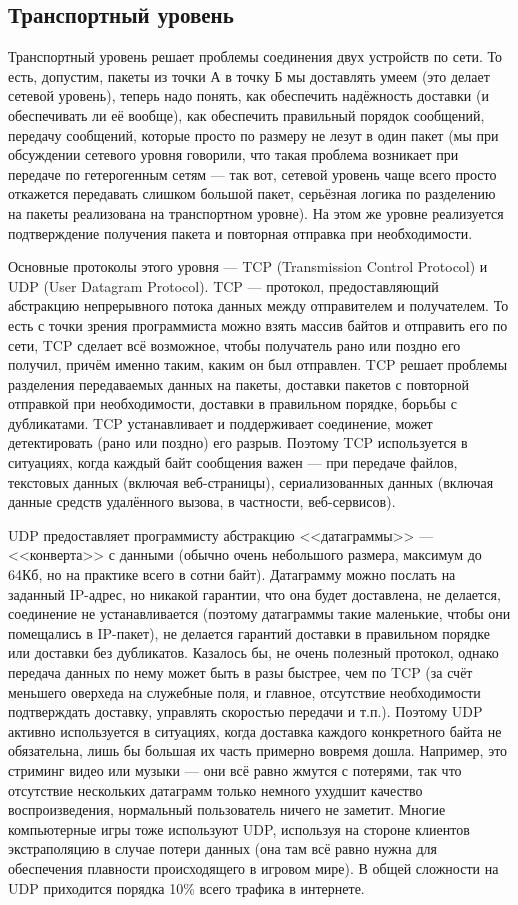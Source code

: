 \documentclass[a5paper]{article}
\begin{document}
\subsection{Транспортный уровень}

Транспортный уровень решает проблемы соединения двух устройств по сети. То есть, допустим, пакеты из точки А в точку Б мы доставлять умеем (это делает сетевой уровень), теперь надо понять, как обеспечить надёжность доставки (и обеспечивать ли её вообще), как обеспечить правильный порядок сообщений, передачу сообщений, которые просто по размеру не лезут в один пакет (мы при обсуждении сетевого уровня говорили, что такая проблема возникает при передаче по гетерогенным сетям --- так вот, сетевой уровень чаще всего просто откажется передавать слишком большой пакет, серьёзная логика по разделению на пакеты реализована на транспортном уровне). На этом же уровне реализуется подтверждение получения пакета и повторная отправка при необходимости.

Основные протоколы этого уровня --- TCP (Transmission Control Protocol) и UDP (User Datagram Protocol). TCP --- протокол, предоставляющий абстракцию непрерывного потока данных между отправителем и получателем. То есть с точки зрения программиста можно взять массив байтов и отправить его по сети, TCP сделает всё возможное, чтобы получатель рано или поздно его получил, причём именно таким, каким он был отправлен. TCP решает проблемы разделения передаваемых данных на пакеты, доставки пакетов с повторной отправкой при необходимости, доставки в правильном порядке, борьбы с дубликатами. TCP устанавливает и поддерживает соединение, может детектировать (рано или поздно) его разрыв. Поэтому TCP используется в ситуациях, когда каждый байт сообщения важен --- при передаче файлов, текстовых данных (включая веб-страницы), сериализованных данных (включая данные средств удалённого вызова, в частности, веб-сервисов).

UDP предоставляет программисту абстракцию <<датаграммы>> --- <<конверта>> с данными (обычно очень небольшого размера, максимум до 64Кб, но на практике всего в сотни байт). Датаграмму можно послать на заданный IP-адрес, но никакой гарантии, что она будет доставлена, не делается, соединение не устанавливается (поэтому датаграммы такие маленькие, чтобы они помещались в IP-пакет), не делается гарантий доставки в правильном порядке или доставки без дубликатов. Казалось бы, не очень полезный протокол, однако передача данных по нему может быть в разы быстрее, чем по TCP (за счёт меньшего оверхеда на служебные поля, и главное, отсутствие необходимости подтверждать доставку, управлять скоростью передачи и т.п.). Поэтому UDP активно используется в ситуациях, когда доставка каждого конкретного байта не обязательна, лишь бы большая их часть примерно вовремя дошла. Например, это стриминг видео или музыки --- они всё равно жмутся с потерями, так что отсутствие нескольких датаграмм только немного ухудшит качество воспроизведения, нормальный пользователь ничего не заметит. Многие компьютерные игры тоже используют UDP, используя на стороне клиентов экстраполяцию в случае потери данных (она там всё равно нужна для обеспечения плавности происходящего в игровом мире). В общей сложности на UDP приходится порядка 10\% всего трафика в интернете.
\end{document}
